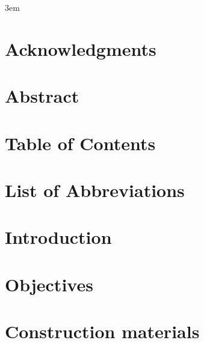 \documentclass[10pt,twoside]{book}
\begin{document}
\emergencystretch 3em

\frontmatter



\chapter{Acknowledgments}
% 
\clearpage

\chapter{Abstract}
% 
\clearpage

\chapter{Table of Contents}
\tableofcontents %
\clearpage



\chapter{List of Abbreviations}
% 
\clearpage

\mainmatter

\chapter{Introduction}
\clearpage


\clearpage

\chapter{Objectives}
\clearpage

% 
\clearpage

\chapter{Construction materials}
\clearpage
\end{document}
